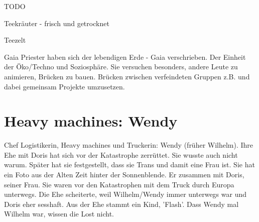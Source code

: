 \begin{npcBox}[title=Laura, Gaianistin]
    \begin{stunts}
    \item {}
    \end{stunts}

    \begin{stressSection}
    \end{stressSection}
    \begin{tabularx}{\textwidth}{ XX }
    \end{tabularx}

    \begin{consequences}
    \item {}
    \item {}
    \item {}
    \end{consequences}

    \begin{npcDescription}
    TODO
    \end{npcDescription}


    \begin{equipment}
    \item Teekräuter - frisch und getrocknet
    \item Teezelt
    \end{equipment}
\end{npcBox}


Gaia Priester haben sich der lebendigen Erde - Gaia verschrieben. Der Einheit der Öko/Techno und Soziosphäre. Sie versuchen besonders, andere Leute zu animieren, Brücken zu bauen. Brücken zwischen verfeindeten Gruppen z.B. und dabei gemeinsam Projekte umzusetzen.

\newpage


\section{Heavy machines: Wendy}

Chef Logistikerin, Heavy machines und Truckerin: Wendy (früher Wilhelm). Ihre Ehe mit Doris hat sich vor der Katastrophe zerrüttet. Sie wusste auch nicht warum. Später hat sie festgestellt, dass sie Trans und damit eine Frau ist. Sie hat ein Foto aus der Alten Zeit hinter der Sonnenblende. Er zusammen mit Doris, seiner Frau. Sie waren vor den Katastrophen mit dem Truck durch Europa unterwegs. Die Ehe scheiterte, weil Wilhelm/Wendy immer unterwegs war und Doris eher sesshaft. Aus der Ehe stammt ein Kind, 'Flash'. Dass Wendy mal Wilhelm war, wissen die Lost nicht.

